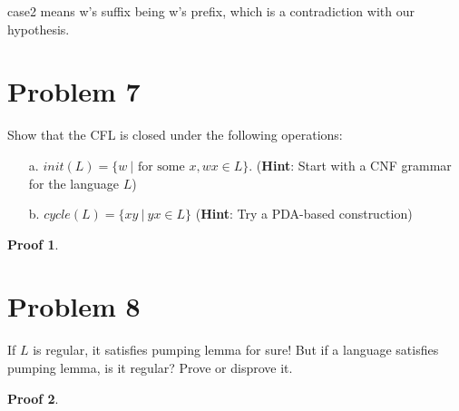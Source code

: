 \documentclass[a4paper,UTF8]{ctexart}
\theoremstyle{definition}
\newtheorem*{prove}{Proof}
\begin{document}
case2 means w's suffix being w's prefix, which is a contradiction with our hypothesis.




\section*{Problem 7}
Show that the CFL is closed under the following operations:
\begin{enumerate}
	\item[a.] $init(L)=\{w\ |\mbox{ for some }x, wx \in L\}$. (\textbf{Hint}: Start with a CNF grammar for the language $L$)
	\item[b.] $cycle(L)=\{xy\ |\ yx \in L\}$ (\textbf{Hint}: Try a PDA-based construction)
\end{enumerate}
\begin{prove}
\end{prove}
\newpage

\section*{Problem 8}
If $L$ is regular, it satisfies pumping lemma for sure! But if a language satisfies pumping lemma, is it regular? Prove or disprove it.
\begin{prove}
\end{prove}
\end{document}

